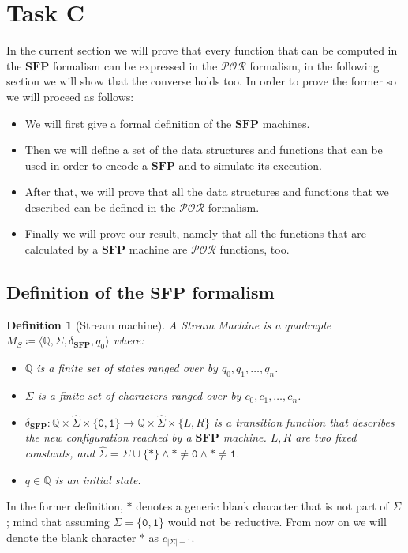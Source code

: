 \documentclass[10pt]{amsart}
\newcommand{\SFP}{\mathbf{SFP}}
\newcommand{\POR}{\mathcal{POR}}
\newcommand{\zero}{\mathtt{0}}
\newcommand{\one}{\mathtt{1}}
\newcommand{\QQ}{\mathbb{Q}}
\newcommand{\ms}{q}
\newcommand{\msi}[1]{q_{#1}}
\newcommand{\mci}[1]{c_{#1}}
\newcommand{\Sigmab}{\hat{\Sigma}}
\newcommand{\mcan}{M_{S}}
\newcommand{\genm}{\mcan\coloneqq \langle \QQ, \Sigma, \TT, \msi0 \rangle}
\newcommand{\TT}{\delta_\SFP}
\newtheorem{defn}{Definition}
\begin{document}
\section{Task C}

In the current section we will prove that every function that can be computed in the $\SFP$ formalism can be expressed in the $\POR$ formalism, in the following section we will show that the converse holds too. In order to prove the former so we will proceed as follows:

\begin{itemize}
\item We will first give a formal definition of the $\SFP$ machines.
\item Then we will define a set of the data structures and functions that can be used in order to encode a $\SFP$ and to simulate its execution.
\item After that, we will prove that all the data structures and functions that we described can be defined in the $\POR$ formalism.
\item Finally we will prove our result, namely that all the functions that are calculated by a $\SFP$ machine are $\POR$ functions, too.
\end{itemize}

\subsection{Definition of the $\SFP$ formalism}

\begin{defn}[Stream machine]
A Stream Machine is a quadruple $\genm$ where:
\begin{itemize}
\item $\QQ$ is a finite set of states ranged over by $\msi 0,  \msi 1, \ldots, \msi n$.
\item $\Sigma$ is a finite set of characters ranged over by $\mci 0,  \mci 1, \ldots, \mci n$.
\item $\TT : \QQ \times \Sigmab  \times \{\zero, \one\} \longrightarrow \QQ \times \Sigmab \times \{L, R\}$ is a transition function that describes the new configuration reached by a $\SFP$ machine. $L, R$ are two fixed constants, and $\Sigmab =\Sigma \cup \{*\} \land *\neq \zero \land * \neq \one$.
\item $\ms \in \QQ$ is an initial state.
\end{itemize}
\end{defn}

In the former definition, $*$ denotes a generic blank character that is not part of $\Sigma$; mind that assuming $\Sigma = \{\zero, \one\}$ would not be reductive. From now on we will denote the blank character $*$ as $\mci{|\Sigma|+1}$.
\end{document}
